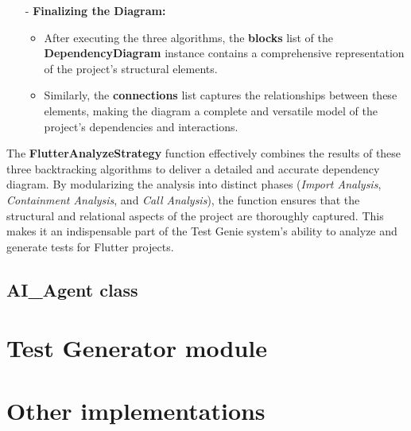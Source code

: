 \begin{itemize}
    \item[-] \textbf{Finalizing the Diagram:}
    \begin{itemize}
        \item After executing the three algorithms, the \textbf{blocks} list of the \textbf{DependencyDiagram} instance contains a comprehensive representation of the project's structural elements.
        \item Similarly, the \textbf{connections} list captures the relationships between these elements, making the diagram a complete and versatile model of the project's dependencies and interactions.
    \end{itemize}
\end{itemize}

The \textbf{FlutterAnalyzeStrategy} function effectively combines the results of these three backtracking algorithms to deliver a detailed and accurate dependency diagram. By modularizing the analysis into distinct phases (\textit{Import Analysis}, \textit{Containment Analysis}, and \textit{Call Analysis}), the function ensures that the structural and relational aspects of the project are thoroughly captured. This makes it an indispensable part of the Test Genie system's ability to analyze and generate tests for Flutter projects.

\subsection{AI\_Agent class}


\section{Test Generator module}

\section{Other implementations}